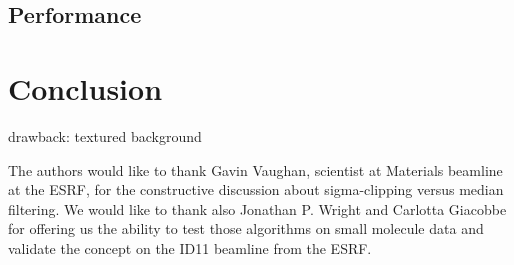 \documentclass[preprint]{iucr}              %
\begin{document}
\subsection{Performance}
\section{Conclusion}
drawback: textured background



The authors would like to thank Gavin Vaughan, scientist at Materials beamline at the ESRF,  for the constructive discussion about sigma-clipping versus median filtering. 
We would like to thank also Jonathan P. Wright and Carlotta Giacobbe for offering us the ability to test those algorithms on small molecule data and validate the concept on the ID11 beamline from the ESRF.




\end{document}
